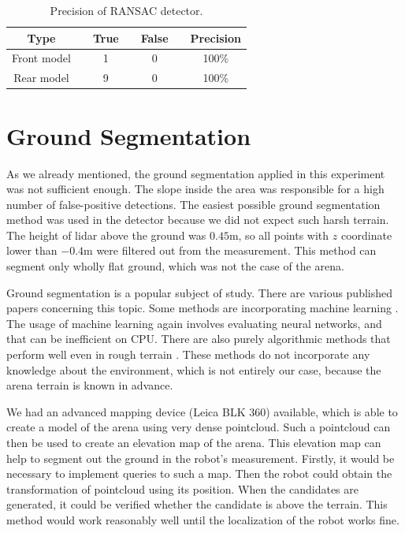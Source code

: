 \begin{table}[H]
	\centering
	\caption{Precision of RANSAC detector.}
	\begin{tabular}{ccccccc}
		\toprule
		Type &\quad& True &\quad& False &\quad& Precision \\
		\midrule
		Front model &\quad& 1 &\quad& 0 &\quad& 100\% \\
		Rear model &\quad& 9 &\quad& 0 &\quad& 100\% \\
		\bottomrule
	\end{tabular}
	\label{tab:RANSAC_precision}
\end{table}


\section{Ground Segmentation}
As we already mentioned, the ground segmentation applied in this experiment was not sufficient enough. The slope inside the area was responsible for a high number of false-positive detections. The easiest possible ground segmentation method was used in the detector because we did not expect such harsh terrain. The height of lidar above the ground was $0.45$m, so all points with $z$ coordinate lower than $-0.4$m were filtered out from the measurement. This method can segment only wholly flat ground, which was not the case of the arena.

Ground segmentation is a popular subject of study. There are various published papers concerning this topic. Some methods are incorporating machine learning \cite{velas2018}. The usage of machine learning again involves evaluating neural networks, and that can be inefficient on CPU. There are also purely algorithmic methods that perform well even in rough terrain \cite{phuong2019}. These methods do not incorporate any knowledge about the environment, which is not entirely our case, because the arena terrain is known in advance.

We had an advanced mapping device (Leica BLK 360) available, which is able to create a model of the arena using very dense pointcloud. Such a pointcloud can then be used to create an elevation map of the arena. This elevation map can help to segment out the ground in the robot's measurement. Firstly, it would be necessary to implement queries to such a map. Then the robot could obtain the transformation of pointcloud using its position. When the candidates are generated, it could be verified whether the candidate is above the terrain. This method would work reasonably well until the localization of the robot works fine.

